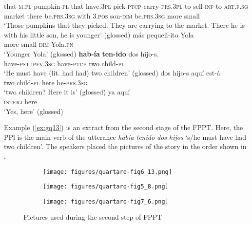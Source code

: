 \documentclass[output=paper]{langsci/langscibook}
\begin{document}
	that-\textsc{m.pl} pumpkin-\textsc{pl} that have.\textsc{3pl} pick-\textsc{ptcp} carry-\textsc{prs.3pl} to sell-\textsc{inf} to \textsc{art.f.sg} market there be.\textsc{prs.3sg} with \textsc{3.pos} son-\textsc{dim} be.\textsc{prs.3sg} more small\\
	\glt ‘Those pumpkins that they picked. They are carrying to the market. There he is with his little son, he is younger’ (glossed)
	\ex \label{ex:gq13h}
	\gll más pequeñ-ito Yola\\
	more small-\textsc{dim} Yola.\textsc{pn}\\
	\glt ‘Younger Yola’ (glossed)
	\ex \label{ex:gq13i}
	\gll \textbf{hab-ía} \textbf{ten-ido} dos hijo-s.\\ 
	have-\textsc{pst.ipfv.3sg} have-\textsc{ptcp} two child-\textsc{pl}\\
	\glt ‘He must have (lit. had had) two children’ (glossed)
	\ex \label{ex:gq13j}
	\gll dos hijo-s aquí est-á\\
	two child-\textsc{pl} here be-\textsc{prs.3sg}\\
	\glt ‘two children? Here it is’ (glossed)
	\ex \label{ex:gq13k}
	\gll ya aquí\\
	\textsc{interj} here\\
	\glt ‘Yes, here’ (glossed)
	\z
\z

Example (\ref{ex:gq13}) is an extract from the second stage of the FPPT. Here, the PPl is the main verb of the utterance \textit{había tenido dos hijos} ‘s/he must have had two children’. The speakers placed the pictures of the story in the order shown in . %

\begin{figure}
    \centering
    \begin{subfigure}[t]{.4\linewidth}
    \centering
    \texttt{[image: figures/quartaro-fig6\_13.png]}
    \caption{ } %
    \end{subfigure}
    \begin{subfigure}[t]{.4\linewidth}
    \centering
     \texttt{[image: figures/quartaro-fig5\_8.png]}
     \caption{  }%
    \end{subfigure}
    \begin{subfigure}[t]{.4\linewidth}
      \centering
    \texttt{[image: figures/quartaro-fig7\_6.png]}
    \caption{ } %
    \end{subfigure}
    \caption{Pictures used during the second step of FPPT} \label{fig:gq3}
\end{figure}
\end{document}
